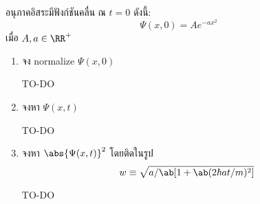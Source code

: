 \begin{exbox}
    อนุภาคอิสระมีฟังก์ชันคลื่น ณ $t = 0$ ดังนี้:
    \begin{equation}
        \Psi(x, 0) = Ae^{-ax^2} \tag{$\star$}
    \end{equation}
    เมื่อ $A, a \in \RR^+$
\end{exbox}
\begin{enumerate}[label=(\alph*)]
    \item จง normalize $\Psi(x, 0)$
    \begin{soln}
        TO-DO
    \end{soln}
    \item จงหา $\Psi(x, t)$
    \begin{soln}
        TO-DO
    \end{soln}
    \item จงหา $\abs{\Psi(x, t)}^2$ โดยติดในรูป
    \[
        w \equiv \sqrt{a/\ab[1 + \ab(2\hbar at/m)^2]}
    \]
    \begin{soln}
        TO-DO
    \end{soln}
\end{enumerate}